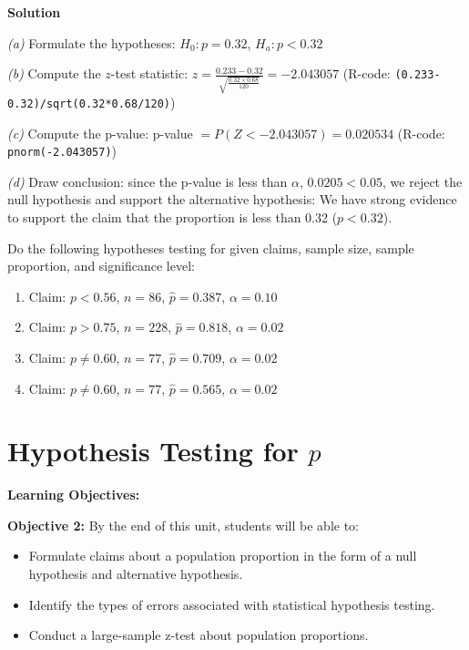 \documentclass[
]{book}
\providecommand{\tightlist}{%
  \setlength{\itemsep}{0pt}\setlength{\parskip}{0pt}}
\begin{document}
\textbf{Solution}

\emph{(a)} Formulate the hypotheses: \(H_0: p=0.32\), \(H_a: p<0.32\)

\emph{(b)} Compute the \(z\)-test statistic: \(z = \frac{0.233-0.32}{\sqrt{\frac{0.32 \times 0.68}{120}}} = -2.043057\) (R-code: \texttt{(0.233-0.32)/sqrt(0.32*0.68/120)})

\emph{(c)} Compute the p-value: p-value \(= P(Z < -2.043057) = 0.020534\) (R-code: \texttt{pnorm(-2.043057)})

\emph{(d)} Draw conclusion: since the p-value is less than \(\alpha\), \(0.0205 < 0.05\), we reject the null hypothesis and support the alternative hypothesis: We have strong evidence to support the claim that the proportion is less than 0.32 (\(p<0.32\)).

Do the following hypotheses testing for given claims, sample size, sample proportion, and significance level:

\begin{enumerate}
\def\labelenumi{\arabic{enumi}.}
\item
  Claim: \(p<0.56\), \(n=86\), \(\hat{p}=0.387\), \(\alpha=0.10\)
\item
  Claim: \(p>0.75\), \(n=228\), \(\hat{p}=0.818\), \(\alpha=0.02\)
\item
  Claim: \(p \neq 0.60\), \(n=77\), \(\hat{p}=0.709\), \(\alpha=0.02\)
\item
  Claim: \(p \neq 0.60\), \(n=77\), \(\hat{p}=0.565\), \(\alpha=0.02\)
\end{enumerate}

\section{\texorpdfstring{Hypothesis Testing for \(p\)}{Hypothesis Testing for p}}\label{hypothesis-testing-for-p}

\textbf{Learning Objectives:}

\textbf{Objective 2:} By the end of this unit, students will be able to:

\begin{itemize}
\tightlist
\item
  Formulate claims about a population proportion in the form of a null hypothesis and alternative hypothesis.
\item
  Identify the types of errors associated with statistical hypothesis testing.
\item
  Conduct a large-sample z-test about population proportions.
\end{itemize}
\end{document}
